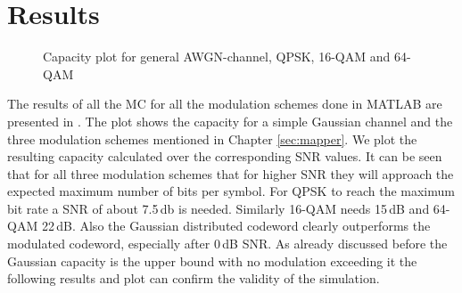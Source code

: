 \section{Results}
\begin{figure}[!htb]
		\setlength{}
	\setlength\fheight{0.4\textheight}
	\centering
	
	\caption{Capacity plot for general AWGN-channel, QPSK, 16-QAM and 64-QAM}
	\label{fig:capmod}
\end{figure}
The results of all the \gls{MC} for all the modulation schemes done in MATLAB are presented in . The plot shows the capacity for a simple Gaussian channel and the three modulation schemes mentioned in Chapter \eqref{sec:mapper}. We plot the resulting capacity calculated over the corresponding SNR values. 
It can be seen that for all three modulation schemes that for higher \gls{SNR} they will approach the expected maximum number of bits per symbol. For \gls{QPSK} to reach the maximum bit rate a \gls{SNR} of about 7.5\,db is needed. Similarly 16-QAM needs 15\,dB and 64-QAM 22\,dB. 
\newline
Also the Gaussian distributed codeword clearly outperforms the modulated codeword, especially  after 0\,dB SNR. As already discussed before the Gaussian capacity is the upper bound with no modulation exceeding it the following results and plot can confirm the validity of the simulation.


\clearpage